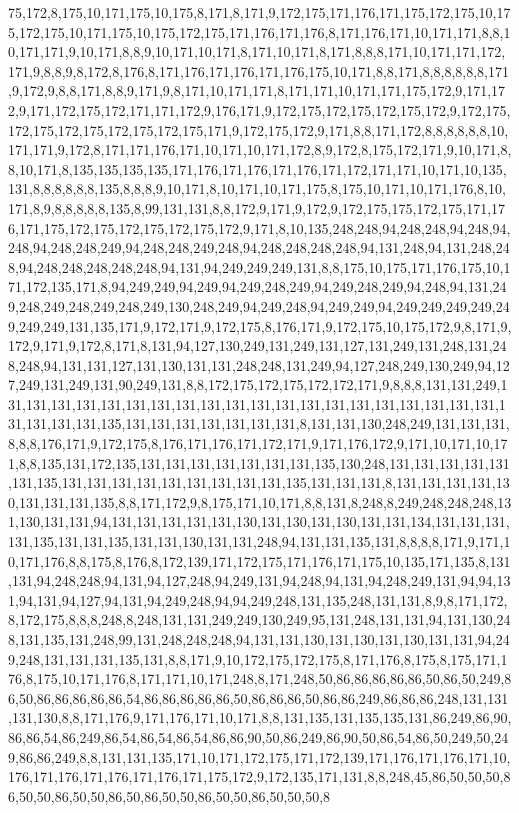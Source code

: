 75,172,8,175,10,171,175,10,175,8,171,8,171,9,172,175,171,176,171,175,172,175,10,175,172,175,10,171,175,10,175,172,175,171,176,171,176,8,171,176,171,10,171,171,8,8,10,171,171,9,10,171,8,8,9,10,171,10,171,8,171,10,171,8,171,8,8,8,171,10,171,171,172,171,9,8,8,9,8,172,8,176,8,171,176,171,176,171,176,175,10,171,8,8,171,8,8,8,8,8,8,171,9,172,9,8,8,171,8,8,9,171,9,8,171,10,171,171,8,171,171,10,171,171,175,172,9,171,172,9,171,172,175,172,171,171,172,9,176,171,9,172,175,172,175,172,175,172,9,172,175,172,175,172,175,172,175,172,175,171,9,172,175,172,9,171,8,8,171,172,8,8,8,8,8,8,10,171,171,9,172,8,171,171,176,171,10,171,10,171,172,8,9,172,8,175,172,171,9,10,171,8,8,10,171,8,135,135,135,135,171,176,171,176,171,176,171,172,171,171,10,171,10,135,131,8,8,8,8,8,8,135,8,8,8,9,10,171,8,10,171,10,171,175,8,175,10,171,10,171,176,8,10,171,8,9,8,8,8,8,8,135,8,99,131,131,8,8,172,9,171,9,172,9,172,175,175,172,175,171,176,171,175,172,175,172,175,172,175,172,9,171,8,10,135,248,248,94,248,248,94,248,94,248,94,248,248,249,94,248,248,249,248,94,248,248,248,248,94,131,248,94,131,248,248,94,248,248,248,248,248,94,131,94,249,249,249,131,8,8,175,10,175,171,176,175,10,171,172,135,171,8,94,249,249,94,249,94,249,248,249,94,249,248,249,94,248,94,131,249,248,249,248,249,248,249,130,248,249,94,249,248,94,249,249,94,249,249,249,249,249,249,249,131,135,171,9,172,171,9,172,175,8,176,171,9,172,175,10,175,172,9,8,171,9,172,9,171,9,172,8,171,8,131,94,127,130,249,131,249,131,127,131,249,131,248,131,248,248,94,131,131,127,131,130,131,131,248,248,131,249,94,127,248,249,130,249,94,127,249,131,249,131,90,249,131,8,8,172,175,172,175,172,172,171,9,8,8,8,131,131,249,131,131,131,131,131,131,131,131,131,131,131,131,131,131,131,131,131,131,131,131,131,131,131,131,135,131,131,131,131,131,131,131,8,131,131,130,248,249,131,131,131,8,8,8,176,171,9,172,175,8,176,171,176,171,172,171,9,171,176,172,9,171,10,171,10,171,8,8,135,131,172,135,131,131,131,131,131,131,131,135,130,248,131,131,131,131,131,131,135,131,131,131,131,131,131,131,131,131,135,131,131,131,8,131,131,131,131,130,131,131,131,135,8,8,171,172,9,8,175,171,10,171,8,8,131,8,248,8,249,248,248,248,131,130,131,131,94,131,131,131,131,131,130,131,130,131,130,131,131,134,131,131,131,131,135,131,131,135,131,131,130,131,131,248,94,131,131,135,131,8,8,8,8,171,9,171,10,171,176,8,8,175,8,176,8,172,139,171,172,175,171,176,171,175,10,135,171,135,8,131,131,94,248,248,94,131,94,127,248,94,249,131,94,248,94,131,94,248,249,131,94,94,131,94,131,94,127,94,131,94,249,248,94,94,249,248,131,135,248,131,131,8,9,8,171,172,8,172,175,8,8,8,248,8,248,131,131,249,249,130,249,95,131,248,131,131,94,131,130,248,131,135,131,248,99,131,248,248,248,94,131,131,130,131,130,131,130,131,131,94,249,248,131,131,131,135,131,8,8,171,9,10,172,175,172,175,8,171,176,8,175,8,175,171,176,8,175,10,171,176,8,171,171,10,171,248,8,171,248,50,86,86,86,86,86,50,86,50,249,86,50,86,86,86,86,86,54,86,86,86,86,86,50,86,86,86,50,86,86,249,86,86,86,248,131,131,131,130,8,8,171,176,9,171,176,171,10,171,8,8,131,135,131,135,135,131,86,249,86,90,86,86,54,86,249,86,54,86,54,86,54,86,86,90,50,86,249,86,90,50,86,54,86,50,249,50,249,86,86,249,8,8,131,131,135,171,10,171,172,175,171,172,139,171,176,171,176,171,10,176,171,176,171,176,171,176,171,175,172,9,172,135,171,131,8,8,248,45,86,50,50,50,86,50,50,86,50,50,86,50,86,50,50,86,50,50,86,50,50,50,8